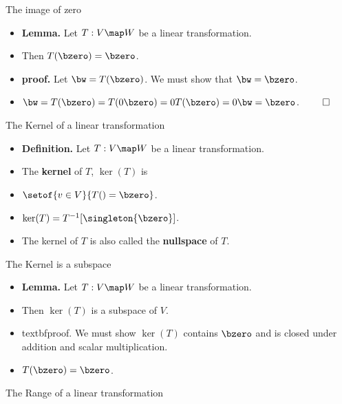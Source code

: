 \documentclass{beamer}
\begin{document}

\begin{frame}{The image of zero}

\begin{itemize}
\item \textbf{Lemma.} Let $T:V\map W$ be a linear transformation.
\item Then $T(\bzero) = \bzero$.
\item \textbf{proof.} Let $\bw = T(\bzero)$. We must show that $\bw=\bzero$.
\item $\bw = T(\bzero) = T(0 \bzero) = 0 T(\bzero) = 0 \bw = \bzero$. $\qed$
\end{itemize}

\end{frame}


\begin{frame}{The Kernel of a linear transformation}

\begin{itemize}
\item \textbf{Definition.} Let $T:V\map W$ be a linear transformation.
\item The \textbf{kernel} of $T$, $\ker(T)$ is
\item $\setof{v\in V}{T() = \bzero}$.
\item $\ker(T) = T^{-1}[\singleton{\bzero}]$.
\item The kernel of $T$ is also called the \textbf{nullspace} of $T$.
\end{itemize}

\end{frame}


\begin{frame}{The Kernel is a subspace}

\begin{itemize}
\item \textbf{Lemma.} Let $T:V\map W$ be a linear transformation.
\item Then $\ker(T)$ is a subspace of $V$.
\item textbf{proof.} We must show $\ker(T)$ contains $\bzero$ and is closed
under addition and scalar multiplication.
\item $T(\bzero) = \bzero$.
\end{itemize}

\end{frame}


\begin{frame}{The Range of a linear transformation}


\end{frame}


\end{document}
